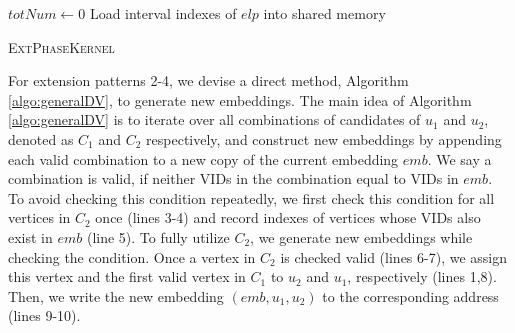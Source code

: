 \begin{algorithm}
$totNum \leftarrow 0$\;
Load interval indexes of $elp$ into shared memory\;

\caption{\textsc{ExtPhaseKernel}}
\label{algo:extphase}
\end{algorithm}

For extension patterns 2-4, we devise a direct method, Algorithm \ref{algo:generalDV}, to generate new embeddings. The main idea of Algorithm \ref{algo:generalDV} is to iterate over all combinations of candidates of $u_{1}$ and $u_{2}$, denoted as $C_1$ and $C_2$ respectively, and construct new embeddings by appending each valid combination to a new copy of the current embedding $emb$. We say a combination is valid, if neither VIDs in the combination equal to VIDs in $emb$. To avoid checking this condition repeatedly, we first check this condition for all vertices in $C_2$ once (lines 3-4) and record indexes of vertices whose VIDs also exist in $emb$ (line 5). To fully utilize $C_2$, we generate new embeddings while checking the condition. Once a vertex in $C_2$ is checked valid (lines 6-7), we assign this vertex and the first valid vertex in $C_1$ to $u_2$ and $u_1$, respectively (lines 1,8). Then, we write the new embedding $(emb,u_1,u_2)$ to the corresponding address (lines 9-10).

